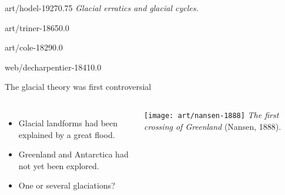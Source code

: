 \documentclass[aspectratio=1610]{beamer}
\begin{document}
    \begin{sectionframe}{art/hodel-1927}{0.75}{\insertsectionhead}
      \emph{Glacial erratics and glacial cycles.}
    \end{sectionframe}

    \begin{backgroundframe}[t]{art/triner-1865}{0.0}{}
      \flushleft{}
    \end{backgroundframe}

    \begin{backgroundframe}[t]{art/cole-1829}{0.0}{}
      \flushleft{}
    \end{backgroundframe}

    \begin{backgroundframe}[b]{web/decharpentier-1841}{0.0}{}
      \flushleft{}
    \end{backgroundframe}

    \begin{frame}{The glacial theory was first controversial}
      \begin{columns}
        \column{60mm}
          \begin{itemize}[<+->]
            \item Glacial landforms had been explained by a great flood.
            \bigskip
            \item Greenland and Antarctica had not yet been explored.
            \bigskip
            \item One or several glaciations?
          \end{itemize}
          \texttt{[image: art/nansen-1888]}
          \emph{The first crossing of Greenland} (Nansen, 1888).
      \end{columns}
    \end{frame}
\end{document}
